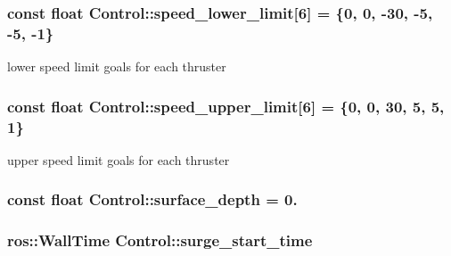 \subsubsection[{\texorpdfstring{speed\+\_\+lower\+\_\+limit}{speed_lower_limit}}]{\setlength{\rightskip}{0pt plus 5cm}const float Control\+::speed\+\_\+lower\+\_\+limit\mbox{[}6\mbox{]} = \{0, 0, -\/30, -\/5, -\/5, -\/1\}\hspace{0.3cm}{\ttfamily [private]}}\hypertarget{classControl_a8a4e9a6981c6adda2ca45420e7b035b8}{}\label{classControl_a8a4e9a6981c6adda2ca45420e7b035b8}


lower speed limit goals for each thruster 

\subsubsection[{\texorpdfstring{speed\+\_\+upper\+\_\+limit}{speed_upper_limit}}]{\setlength{\rightskip}{0pt plus 5cm}const float Control\+::speed\+\_\+upper\+\_\+limit\mbox{[}6\mbox{]} = \{0, 0, 30, 5, 5, 1\}\hspace{0.3cm}{\ttfamily [private]}}\hypertarget{classControl_a98641c8463a36108205726d108ebf101}{}\label{classControl_a98641c8463a36108205726d108ebf101}


upper speed limit goals for each thruster 

\subsubsection[{\texorpdfstring{surface\+\_\+depth}{surface_depth}}]{\setlength{\rightskip}{0pt plus 5cm}const float Control\+::surface\+\_\+depth = 0.\hspace{0.3cm}{\ttfamily [private]}}\hypertarget{classControl_aea3797b8e27792b1d7887b92da69486e}{}\label{classControl_aea3797b8e27792b1d7887b92da69486e}
\subsubsection[{\texorpdfstring{surge\+\_\+start\+\_\+time}{surge_start_time}}]{\setlength{\rightskip}{0pt plus 5cm}ros\+::\+Wall\+Time Control\+::surge\+\_\+start\+\_\+time\hspace{0.3cm}{\ttfamily [private]}}\hypertarget{classControl_ac4d0e192a272517b5921915e65869b7b}{}\label{classControl_ac4d0e192a272517b5921915e65869b7b}
